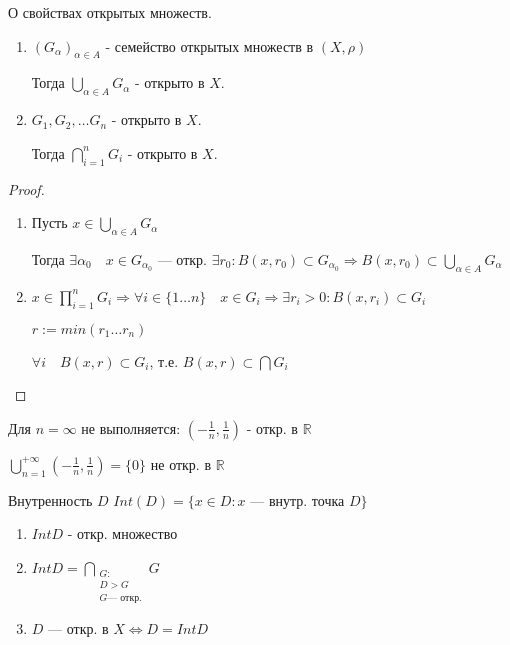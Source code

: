 \begin{theorem}
    О свойствах открытых множеств.

    \begin{enumerate}
        \item $(G_\alpha)_{\alpha\in A}$ - семейство открытых множеств в $(X,\rho)$
        
        Тогда $\bigcup\limits_{\alpha\in A} G_\alpha$ - открыто в $X$.

        \item $G_1,G_2,\ldots G_n$ - открыто в $X$.
        
        Тогда $\bigcap\limits_{i=1}^{n} G_i$ - открыто в $X$.
    \end{enumerate}

\end{theorem}

\begin{proof}
    \begin{enumerate}
        \item Пусть $x\in \bigcup_{\alpha\in A} G_\alpha$
        
        Тогда $\exists \alpha_0 \quad x\in G_{\alpha_0}$ --- откр. $\exists r_0 : B(x,r_0)\subset G_{\alpha_0} \Rightarrow B(x,r_0)\subset\bigcup_{\alpha\in A} G_\alpha$

        \item $x\in \prod_{i=1}^n G_i \Rightarrow \forall i\in\{1\ldots n\} \quad x\in G_i \Rightarrow \exists r_i>0 : B(x,r_i)\subset G_i$
        
        $r:=min(r_1\ldots r_n)$

        $\forall i \quad B(x,r)\subset G_i$, т.е. $B(x,r)\subset\bigcap G_i$
    \end{enumerate}
\end{proof}

\begin{remark}
    Для $n=\infty$ не выполняется: $(-\frac{1}{n},\frac{1}{n})$ - откр. в $\mathbb{R}$

    $\bigcup_{n=1}^{+\infty}(-\frac{1}{n},\frac{1}{n})=\{0\}$ не откр. в $\mathbb{R}$
\end{remark}

\begin{definition}
    Внутренность $D$ $Int(D)=\{x\in D : x \text{ --- внутр. точка }D\}$
\end{definition}

\begin{remark}
    \begin{enumerate}
        \item $Int D$ - откр. множество
        \item $Int D=\bigcap\limits_{\substack{G: \\ D>G \\ G \text{--- откр.}}} G$
        \item $D$ --- откр. в $X \Leftrightarrow D=Int D$
    \end{enumerate}
\end{remark}

